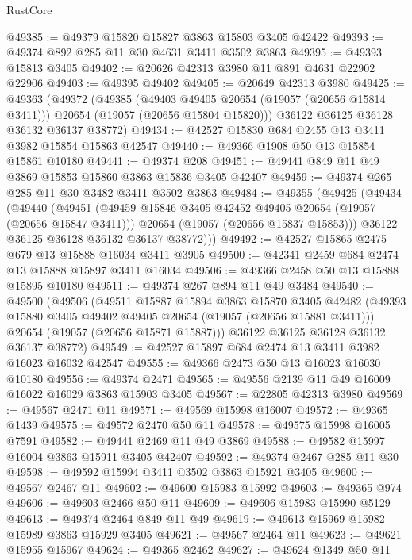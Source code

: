 \begin{lexlean}{RustCore}
\begin{coremodule}
@49385 := @49379 @15820 @15827 @3863 @15803 @3405 @42422
@49393 := @49374 @892 @285 @11 @30 @4631 @3411 @3502 @3863
@49395 := @49393 @15813 @3405
@49402 := @20626 @42313 @3980 @11 @891 @4631 @22902 @22906
@49403 := @49395 @49402
@49405 := @20649 @42313 @3980
@49425 := @49363
    (@49372
      (@49385
        (@49403 @49405 @20654 (@19057 (@20656 @15814 @3411)))
        @20654
        (@19057 (@20656 @15804 @15820)))
      @36122
      @36125
      @36128
      @36132
      @36137
      @38772)
@49434 := @42527 @15830 @684 @2455 @13 @3411 @3982 @15854 @15863 @42547
@49440 := @49366 @1908 @50 @13 @15854 @15861 @10180
@49441 := @49374 @208
@49451 := @49441 @849 @11 @49 @3869 @15853 @15860 @3863 @15836 @3405 @42407
@49459 := @49374 @265 @285 @11 @30 @3482 @3411 @3502 @3863
@49484 := @49355
    (@49425
      (@49434
        (@49440
          (@49451
            (@49459 @15846 @3405 @42452 @49405 @20654 (@19057 (@20656 @15847 @3411)))
            @20654
            (@19057 (@20656 @15837 @15853)))
          @36122
          @36125
          @36128
          @36132
          @36137
          @38772)))
@49492 := @42527 @15865 @2475 @679 @13 @15888 @16034 @3411 @3905
@49500 := @42341 @2459 @684 @2474 @13 @15888 @15897 @3411 @16034
@49506 := @49366 @2458 @50 @13 @15888 @15895 @10180
@49511 := @49374 @267 @894 @11 @49 @3484
@49540 := @49500
    (@49506
      (@49511
        @15887
        @15894
        @3863
        @15870
        @3405
        @42482
        (@49393 @15880 @3405 @49402 @49405 @20654 (@19057 (@20656 @15881 @3411)))
        @20654
        (@19057 (@20656 @15871 @15887)))
      @36122
      @36125
      @36128
      @36132
      @36137
      @38772)
@49549 := @42527 @15897 @684 @2474 @13 @3411 @3982 @16023 @16032 @42547
@49555 := @49366 @2473 @50 @13 @16023 @16030 @10180
@49556 := @49374 @2471
@49565 := @49556 @2139 @11 @49 @16009 @16022 @16029 @3863 @15903 @3405
@49567 := @22805 @42313 @3980
@49569 := @49567 @2471 @11
@49571 := @49569 @15998 @16007
@49572 := @49365 @1439
@49575 := @49572 @2470 @50 @11
@49578 := @49575 @15998 @16005 @7591
@49582 := @49441 @2469 @11 @49 @3869
@49588 := @49582 @15997 @16004 @3863 @15911 @3405 @42407
@49592 := @49374 @2467 @285 @11 @30
@49598 := @49592 @15994 @3411 @3502 @3863 @15921 @3405
@49600 := @49567 @2467 @11
@49602 := @49600 @15983 @15992
@49603 := @49365 @974
@49606 := @49603 @2466 @50 @11
@49609 := @49606 @15983 @15990 @5129
@49613 := @49374 @2464 @849 @11 @49
@49619 := @49613 @15969 @15982 @15989 @3863 @15929 @3405
@49621 := @49567 @2464 @11
@49623 := @49621 @15955 @15967
@49624 := @49365 @2462
@49627 := @49624 @1349 @50 @11

\end{coremodule}
\end{lexlean}
